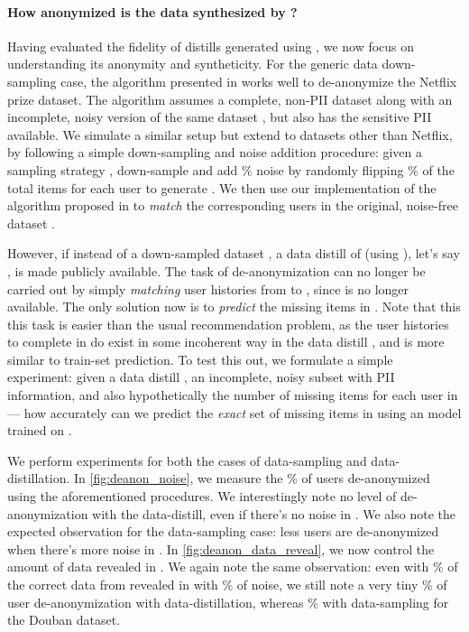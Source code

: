 \documentclass{article}
\begin{document}
\paragraph{How anonymized is the data synthesized by \sampler?} Having evaluated the fidelity of distills generated using \sampler, we now focus on understanding its anonymity and syntheticity. For the generic data down-sampling case, the algorithm presented in \cite{netflix_deanon} works well to de-anonymize the Netflix prize dataset. The algorithm assumes a complete, non-PII dataset  along with an incomplete, noisy version of the same dataset , but also has the sensitive PII available. We simulate a similar setup but extend to datasets other than Netflix, by following a simple down-sampling and noise addition procedure: given a sampling strategy , down-sample  and add \% noise by randomly flipping \% of the total items for each user to generate . We then use our implementation of the algorithm proposed in \cite{netflix_deanon} to \emph{match} the corresponding users in the original, noise-free dataset . 

However, if instead of a down-sampled dataset , a data distill of  (using \sampler), let's say , is made publicly available. The task of de-anonymization can no longer be carried out by simply \emph{matching} user histories from  to , since  is no longer available. The only solution now is to \emph{predict} the missing items in . Note that this this task is easier than the usual recommendation problem, as the user histories to complete in  do exist in some incoherent way in the data distill , and is more similar to train-set prediction. To test this out, we formulate a simple experiment: given a data distill , an incomplete, noisy subset  with PII information, and also hypothetically the number of missing items for each user in  --- how accurately can we predict the \emph{exact} set of missing items in  using an \model model trained on .

We perform experiments for both the cases of data-sampling and data-distillation. In \cref{fig:deanon_noise}, we measure the \% of users de-anonymized using the aforementioned procedures. We interestingly note no level of de-anonymization with the data-distill, even if there's no noise in . We also note the expected observation for the data-sampling case: less users are de-anonymized when there's more noise in . In \cref{fig:deanon_data_reveal}, we now control the amount of data revealed in . We again note the same observation: even with \% of the correct data from  revealed in  with \% of noise, we still note a very tiny \% of user de-anonymization with data-distillation, whereas \% with data-sampling for the Douban dataset.
\end{document}
